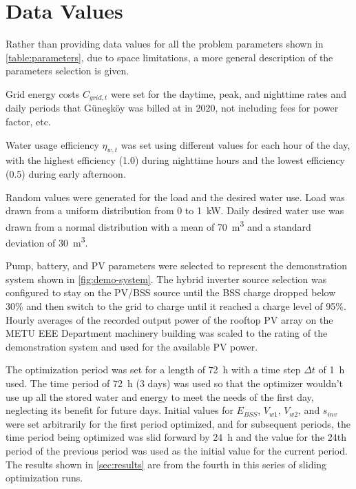 \section{Data Values}

Rather than providing data values for all the problem parameters shown in \autoref{table:parameters}, due to space limitations, a more general description of the parameters selection is given.

Grid energy costs $C_{grid,t}$ were set for the daytime, peak, and nighttime rates and daily periods that Güneşköy was billed at in 2020, not including fees for power factor, etc.

Water usage efficiency $\eta_{w,t}$ was set using different values for each hour of the day, with the highest efficiency (\num{1.0}) during nighttime hours and the lowest efficiency (\num{0.5}) during early afternoon.

Random values were generated for the load and the desired water use. Load was drawn from a uniform distribution from 0 to \SI{1}{kW}.
Daily desired water use was drawn from a normal distribution with a mean of \SI{70}{m^3} and a standard deviation of \SI{30}{m^3}.

Pump, battery, and PV parameters were selected to represent the demonstration system shown in \autoref{fig:demo-system}.
The hybrid inverter source selection was configured to stay on the PV/BSS source until the BSS charge dropped below 30\% and then switch to the grid to charge until it reached a charge level of 95\%.
Hourly averages of the recorded output power of the rooftop PV array on the METU EEE Department machinery building was scaled to the rating of the demonstration system and used for the available PV power.

The optimization period was set for a length of \SI{72}{h} with a time step $\Delta t$ of \SI{1}{h} used. The time period of \SI{72}{h} (3 days) was used so that the optimizer wouldn't use up all the stored water and energy to meet the needs of the first day, neglecting its benefit for future days.
Initial values for $E_{BSS}$, $V_{w1}$, $V_{w2}$, and $s_{inv}$ were set arbitrarily for the first period optimized, and for subsequent periods, the time period being optimized was slid forward by \SI{24}{h} and the value for the 24th period of the previous period was used as the initial value for the current period.
The results shown in \autoref{sec:results} are from the fourth in this series of sliding optimization runs.